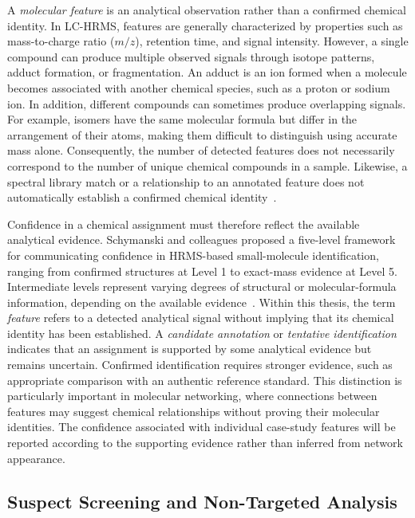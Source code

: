         A \emph{molecular feature} is an analytical observation rather than a confirmed chemical identity. In LC-HRMS, features are generally characterized by properties such as mass-to-charge ratio ($m/z$), retention time, and signal intensity. However, a single compound can produce multiple observed signals through isotope patterns, adduct formation, or fragmentation. An adduct is an ion formed when a molecule becomes associated with another chemical species, such as a proton or sodium ion. In addition, different compounds can sometimes produce overlapping signals. For example, isomers have the same molecular formula but differ in the arrangement of their atoms, making them difficult to distinguish using accurate mass alone. Consequently, the number of detected features does not necessarily correspond to the number of unique chemical compounds in a sample. Likewise, a spectral library match or a relationship to an annotated feature does not automatically establish a confirmed chemical identity~\cite{Manz2023,Schymanski2014}.

        Confidence in a chemical assignment must therefore reflect the available analytical evidence. Schymanski and colleagues proposed a five-level framework for communicating confidence in HRMS-based small-molecule identification, ranging from confirmed structures at Level 1 to exact-mass evidence at Level 5. Intermediate levels represent varying degrees of structural or molecular-formula information, depending on the available evidence~\cite{Schymanski2014}. Within this thesis, the term \emph{feature} refers to a detected analytical signal without implying that its chemical identity has been established. A \emph{candidate annotation} or \emph{tentative identification} indicates that an assignment is supported by some analytical evidence but remains uncertain. Confirmed identification requires stronger evidence, such as appropriate comparison with an authentic reference standard. This distinction is particularly important in molecular networking, where connections between features may suggest chemical relationships without proving their molecular identities. The confidence associated with individual case-study features will be reported according to the supporting evidence rather than inferred from network appearance.

    \subsection{Suspect Screening and Non-Targeted Analysis}\label{subsec:suspect-nta}

